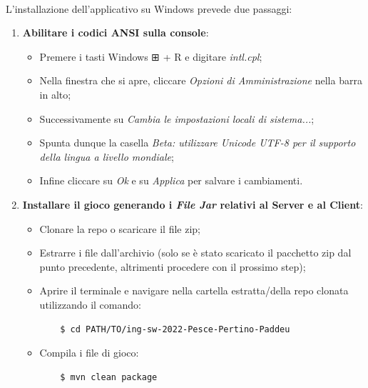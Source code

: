 \documentclass[a4paper, 12pt]{article}
\begin{document}
	\paragraph{}
	L'installazione dell'applicativo su Windows prevede due passaggi:
	\begin{enumerate}
		\item \textbf{Abilitare i codici ANSI sulla console}:
			  \begin{itemize}
			  	  \item Premere i tasti Windows ⊞ + R e digitare \textit{intl.cpl};
			  	  \item Nella finestra che si apre, cliccare \textit{Opzioni di Amministrazione} nella barra in alto;
			  	  \item Successivamente su \textit{Cambia le impostazioni locali di sistema...};
			  	  \item Spunta dunque la casella \textit{Beta: utilizzare Unicode UTF-8 per il supporto della lingua a livello mondiale};
			  	  \item Infine cliccare su \textit{Ok} e su \textit{Applica} per salvare i cambiamenti.
			  \end{itemize}
		
		\item \textbf{Installare il gioco generando i \textit{File Jar} relativi al Server e al Client}:
			  \begin{itemize}
			  	  \item Clonare la repo o scaricare il file zip;
			  	  \item Estrarre i file dall'archivio (solo se è stato scaricato il pacchetto zip dal punto precedente, altrimenti procedere con il prossimo step);
			  	  \item Aprire il terminale e navigare nella cartella estratta/della repo clonata utilizzando il comando:
				  \begin{verbatim}
	$ cd PATH/TO/ing-sw-2022-Pesce-Pertino-Paddeu
				  \end{verbatim}
			  	  \item Compila i file di gioco:
			  	  \begin{verbatim}
	$ mvn clean package
			  	  \end{verbatim}
			  \end{itemize}
	\end{enumerate}
\end{document}
